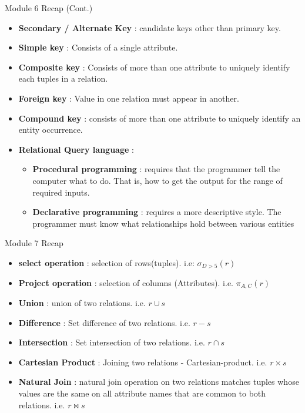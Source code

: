 \documentclass[aspectratio=169, xcolor=dvipsnames]{beamer}
\begin{document}
\begin{frame}{Module 6 Recap (Cont.)}
    \begin{itemize}[<+->]
        \item \textbf{Secondary / Alternate Key} : candidate keys other than primary key.
        \item \textbf{Simple key} : Consists of a single attribute.
        \item \textbf{Composite key} : Consists of more than one attribute to uniquely identify each tuples in a relation.
        \item \textbf{Foreign key} : Value in one relation must appear in another.
        \item \textbf{Compound key} : consists of more than one attribute to uniquely identify an entity occurrence.
        \item \textbf{Relational Query language} :
        \begin{itemize}
            \item[$\triangleright$] \textbf{Procedural programming} : requires that the programmer tell the computer what to do. That is, how to get the output for the range of required inputs.
            \item[$\triangleright$] \textbf{Declarative programming} : requires a more descriptive style. The programmer must know what relationships hold between various entities
        \end{itemize}
    \end{itemize}
\end{frame}

\begin{frame}{Module 7 Recap}
    \begin{itemize}[<+->]
        \item \textbf{select operation} : selection of rows(tuples). i.e: $\sigma_{D > 5}(r)$
        \item \textbf{Project operation} : selection of columns (Attributes). i.e. $\pi_{A,C}(r)$
        \item \textbf{Union} : union of two relations. i.e. $r \cup s$
        \item \textbf{Difference} : Set difference of two relations. i.e. $r - s$
        \item \textbf{Intersection} : Set intersection of two relations. i.e. $r \cap s$
        \item \textbf{Cartesian Product} : Joining two relations - Cartesian-product. i.e. $r \times s$
        \item \textbf{Natural Join} : natural join operation on two relations matches tuples whose values are the same on all attribute names that are common to both relations. i.e. $r \bowtie s$
    \end{itemize}
\end{frame}
\end{document}
